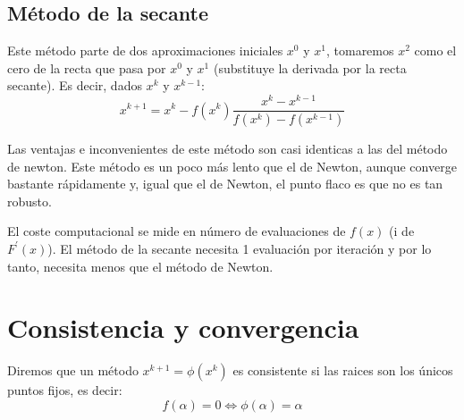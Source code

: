 \begin{center}
\end{center}

\subsection{Método de la secante}

Este método parte de dos aproximaciones iniciales $x^0$ y $x^1$, tomaremos $x^2$ como el cero de la recta
que pasa por $x^0$ y $x^1$ (substituye la derivada por la recta secante). Es decir, dados $x^k$ y $x^{k-1}$:
\[
    x^{k+1} = x^k - f\left( x^k \right) \frac{x^k - x^{k-1}}{f\left( x^k \right) - f\left( x^{k-1} \right)}
\]

Las ventajas e inconvenientes de este método son casi identicas a las del método de newton. Este método
es un poco más lento que el de Newton, aunque converge bastante rápidamente y, igual que el de Newton,
el punto flaco es que no es tan robusto.

\begin{obs*}
    El coste computacional se mide en número de evaluaciones de $f(x)$ (i de $F^\prime(x)$).
    El método de la secante necesita 1 evaluación por iteración y por lo tanto, necesita menos que
    el método de Newton.
\end{obs*}

\section{Consistencia y convergencia}

\begin{defi}
    Diremos que un método $x^{k+1} = \phi\left( x^k \right)$ es consistente si las raices son
    los únicos puntos fijos, es decir:
    \[
        f(\alpha) = 0 \iff \phi(\alpha) = \alpha
    \]
\end{defi}

